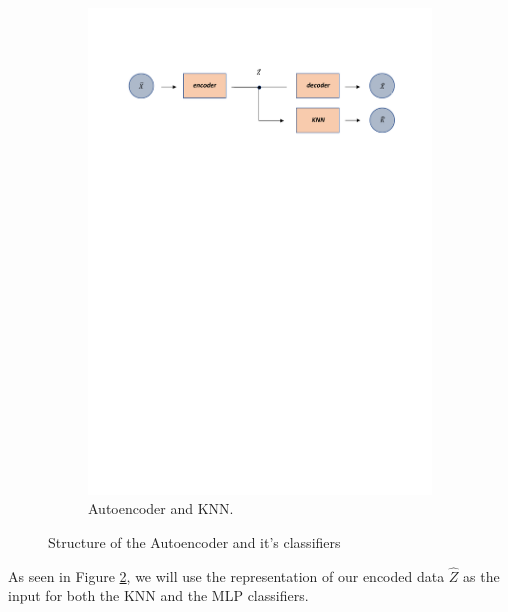 \begin{figure}[H]
\begin{subfigure}{0.98\linewidth} 
  \centering
  \includegraphics[width=\linewidth]{Figuras_tfg/Diagram_auto_KNN}
  \caption{Autoencoder and KNN.}
  \label{fig:FigB_Autoencoder_KNN} 
\end{subfigure}
  \caption{Structure of the Autoencoder and it's classifiers}
 \label{fig:Autoencoder_architecture}
\end{figure}

As seen in Figure \ref{fig:Autoencoder_architecture}, we will use the representation of our encoded data $\hat{Z}$ as the input for both the KNN and the MLP classifiers.


